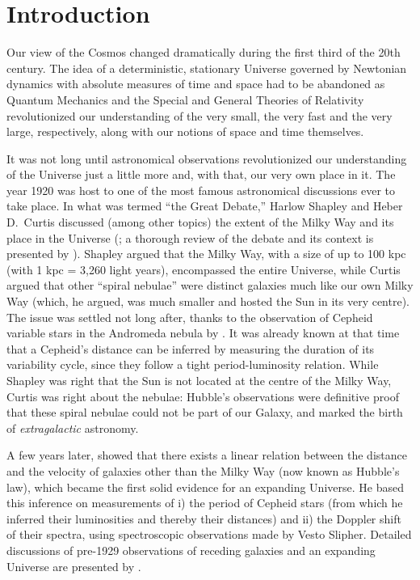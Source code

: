 
\chapter{Introduction}


Our view of the Cosmos changed dramatically during the first third of the 20th century. The idea of a deterministic, stationary Universe governed by Newtonian dynamics with absolute measures of time and space had to be abandoned as Quantum Mechanics and the Special and General Theories of Relativity revolutionized our understanding of the very small, the very fast and the very large, respectively, along with our notions of space and time themselves.

It was not long until astronomical observations revolutionized our understanding of the Universe just a little more and, with that, our very own place in it. The year 1920 was host to one of the most famous astronomical discussions ever to take place. In what was termed ``the Great Debate,'' Harlow Shapley and Heber D.\ Curtis discussed (among other topics) the extent of the Milky Way and its place in the Universe (\citealt{shapley21}; a thorough review of the debate and its context is presented by \citealt{trimble95}). Shapley argued that the Milky Way, with a size of up to 100 kpc (with 1 kpc = 3,260 light years), encompassed the entire Universe, while Curtis argued that other ``spiral nebulae'' were distinct galaxies much like our own Milky Way (which, he argued, was much smaller and hosted the Sun in its very centre). The issue was settled not long after, thanks to the observation of Cepheid variable stars in the Andromeda nebula by \cite{hubble25}. It was already known at that time that a Cepheid's distance can be inferred by measuring the duration of its variability cycle, since they follow a tight period-luminosity relation. While Shapley was right that the Sun is not located at the centre of the Milky Way, Curtis was right about the nebulae: Hubble's observations were definitive proof that these spiral nebulae could not be part of our Galaxy, and marked the birth of \emph{extragalactic} astronomy. 

A few years later, \cite{hubble29} showed that there exists a linear relation between the distance and the velocity of galaxies other than the Milky Way (now known as Hubble's law), which became the first solid evidence for an expanding Universe. He based this inference on measurements of i) the period of Cepheid stars (from which he inferred their luminosities and thereby their distances) and ii) the Doppler shift of their spectra, using spectroscopic observations made by Vesto Slipher. Detailed discussions of pre-1929 observations of receding galaxies and an expanding Universe are presented by \cite{trimble12,trimble13}.

